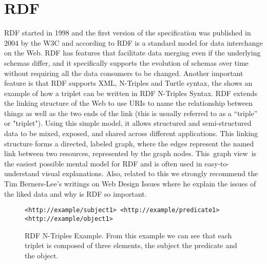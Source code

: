 \section{RDF}
RDF started in 1998 and the first version of the specification was published in 2004 by the W3C and according to  RDF is a standard model for data interchange on the Web. RDF has features that facilitate data merging even if the underlying schemas differ, and it specifically supports the evolution of schemas over time without requiring all the data consumers to be changed. Another important feature is that RDF supports XML, N-Triples and Turtle syntax, the  shows an example of how a triplet can be written in RDF N-Triples Syntax.
RDF extends the linking structure of the Web to use URIs to name the relationship between things as well as the two ends of the link (this is usually referred to as a “triple” or "triplet"). Using this simple model, it allows structured and semi-structured data to be mixed, exposed, and shared across different applications.
This linking structure forms a directed, labeled graph, where the edges represent the named link between two resources, represented by the graph nodes. This graph view is the easiest possible mental model for RDF and is often used in easy-to-understand visual explanations.
Also, related to this we strongly recommend the Tim Berners-Lee’s writings on Web Design Issues  where he explain the issues of the liked data and why is RDF so important.

\begin{figure}[hb]
\begin{lstlisting}
<http://example/subject1> <http://example/predicate1> <http://example/object1>
\end{lstlisting}
\caption[RDF N-Triples Example]{RDF N-Triples Example. From this example we can see that each triplet is composed of three elements, the subject the predicate and the object.}
\end{figure}
